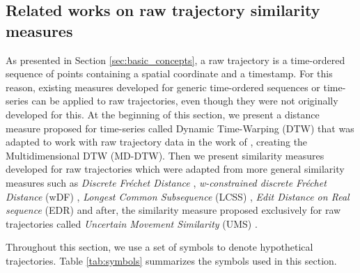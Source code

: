 \subsection{Related works on raw trajectory similarity measures} \label{sec:related_raw}
As presented in Section {\ref{sec:basic_concepts},} a raw trajectory is a time-ordered sequence of points containing a spatial coordinate and a timestamp. For this reason, existing measures developed for generic time-ordered sequences or time-series can be applied to raw trajectories, even though they were not originally developed for this. At the beginning of this section, we present a distance measure proposed for time-series  called Dynamic Time-Warping (DTW)\cite{berndt1994using} that was adapted to work with raw trajectory data in the work of \cite{ten2007multi}, creating the Multidimensional DTW (MD-DTW). Then we present similarity measures developed for raw trajectories which were adapted from more general similarity measures such as \textit{Discrete Fr{\'e}chet Distance} \cite{eiter1994computing}, \textit{w-constrained discrete Fr{\'e}chet Distance} (wDF) \cite{Ding:2008:ESJ:1440463.1440989}, \textit{Longest Common Subsequence} (LCSS) \cite{vlachos2002discovering}, \textit{Edit Distance on Real sequence} (EDR) \cite{Chen:2005:RFS:1066157.1066213} and after, the similarity measure proposed exclusively for raw trajectories called \textit{Uncertain Movement Similarity} (UMS) \cite{Furtado-UMS-2018}.

Throughout this section, we use a set of symbols to denote hypothetical trajectories. Table \ref{tab:symbols} summarizes the symbols used in this section.

\begin{table}[!h]
    \centering
    \caption{Symbol meanings}
    \label{tab:symbols}
\end{table}

